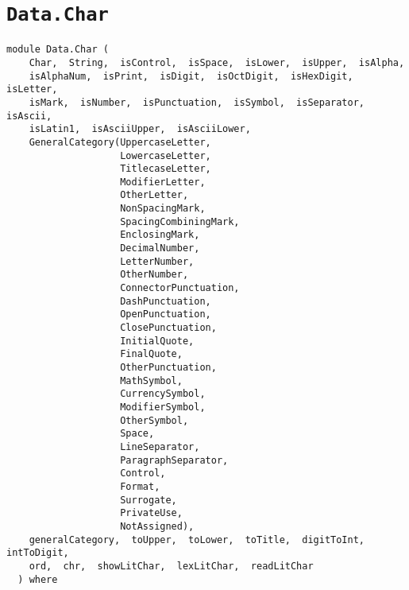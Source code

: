 \chapter{\texttt{Data.Char}}
\label{module:Data.Char}
\haddockbeginheader
{\haddockverb\begin{verbatim}
module Data.Char (
    Char,  String,  isControl,  isSpace,  isLower,  isUpper,  isAlpha, 
    isAlphaNum,  isPrint,  isDigit,  isOctDigit,  isHexDigit,  isLetter, 
    isMark,  isNumber,  isPunctuation,  isSymbol,  isSeparator,  isAscii, 
    isLatin1,  isAsciiUpper,  isAsciiLower, 
    GeneralCategory(UppercaseLetter,
                    LowercaseLetter,
                    TitlecaseLetter,
                    ModifierLetter,
                    OtherLetter,
                    NonSpacingMark,
                    SpacingCombiningMark,
                    EnclosingMark,
                    DecimalNumber,
                    LetterNumber,
                    OtherNumber,
                    ConnectorPunctuation,
                    DashPunctuation,
                    OpenPunctuation,
                    ClosePunctuation,
                    InitialQuote,
                    FinalQuote,
                    OtherPunctuation,
                    MathSymbol,
                    CurrencySymbol,
                    ModifierSymbol,
                    OtherSymbol,
                    Space,
                    LineSeparator,
                    ParagraphSeparator,
                    Control,
                    Format,
                    Surrogate,
                    PrivateUse,
                    NotAssigned), 
    generalCategory,  toUpper,  toLower,  toTitle,  digitToInt,  intToDigit, 
    ord,  chr,  showLitChar,  lexLitChar,  readLitChar
  ) where\end{verbatim}}
\haddockendheader

